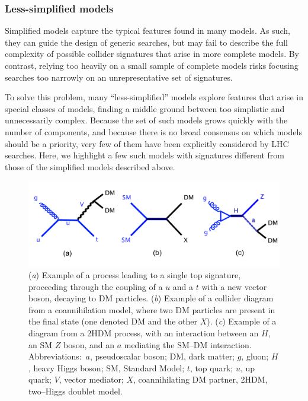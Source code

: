 \documentclass{ar-1col}
\providecommand{\DIFaddbeginFL}{} %
\providecommand{\DIFaddendFL}{} %
\begin{document}
{\subsubsection{Less-simplified models}\label{sec:LessSimplifiedModels}

Simplified models capture the typical features found in many models. 
As such, they can guide the design of generic searches, but may fail to describe
the full complexity of possible collider signatures that
arise in more complete models. By contrast, 
relying too heavily on a small sample of complete models risks focusing
searches too narrowly on an unrepresentative set of signatures.

To solve this problem, 
many ``less-simplified'' models explore features that arise in special classes of models, 
finding a middle ground between too
simplistic and unnecessarily complex. Because the
set of such models grows quickly with the number of components,
and because there is no broad consensus on which models should be a
priority, very few of them have been explicitly considered by LHC
searches. Here, we highlight a few such models with signatures different from those of
 the simplified models described above.

\begin{figure}[!htpb]
\DIFaddbeginFL \includegraphics[width=\textwidth]{figs_standalone/feynman_2}
\DIFaddendFL \caption{
(\textit{a}) Example of a process leading to a single top signature, proceeding through the coupling of a $u$ and a $t$ with a new vector boson, decaying to DM particles. 
(\textit{b}) Example of a collider diagram from a coannihilation model, where two DM particles are present in the final state (one denoted DM and the other  $X$). 
(\textit{c}) Example of a diagram from a 2HDM process, with an interaction between an  $H$, an SM $Z$ boson, and an $a$ mediating the SM--DM interaction. 
Abbreviations:\ $a$, pseudoscalar boson; DM, dark matter; $g$, gluon; $H$, heavy Higgs boson; SM, Standard Model; $t$, top quark;  $u$, up quark; $V$, vector mediator; $X$, coannihilating DM partner, 2HDM, two--Higgs doublet model.}
\label{fig:feynman_2}
\end{figure}

}
\end{document}

